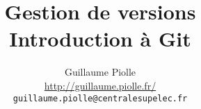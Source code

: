 \documentclass[a4paper,twoside,french]{book}
\begin{document}
\pagestyle{empty}


\newcommand{\maintainer}{Guillaume Piolle}
\newcommand{\maintainerurl}{\url{http://guillaume.piolle.fr/}}
\newcommand{\maintainermail}{guillaume.piolle@centralesupelec.fr}
\newcommand{\currentVersion}{0.0}
  
\title{\Huge Gestion de versions\\Introduction à Git}
\author{\Large \maintainer\\\maintainerurl\\\texttt{\maintainermail}\\}
\date{}

\maketitle
\end{document}

